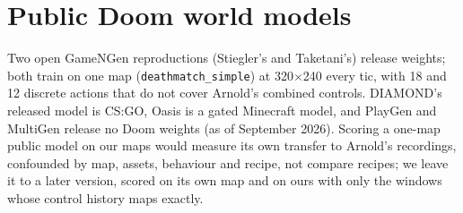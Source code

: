 \section{Public Doom world models}
\label{app:public}

Two open GameNGen reproductions (Stiegler's and Taketani's) release weights; both train on one map (\texttt{deathmatch\_simple}) at 320$\times$240 every tic, with 18 and 12 discrete actions that do not cover Arnold's combined controls. DIAMOND's released model is CS:GO, Oasis is a gated Minecraft model, and PlayGen and MultiGen release no Doom weights (as of September 2026). Scoring a one-map public model on our maps would measure its own transfer to Arnold's recordings, confounded by map, assets, behaviour and recipe, not compare recipes; we leave it to a later version, scored on its own map and on ours with only the windows whose control history maps exactly.

